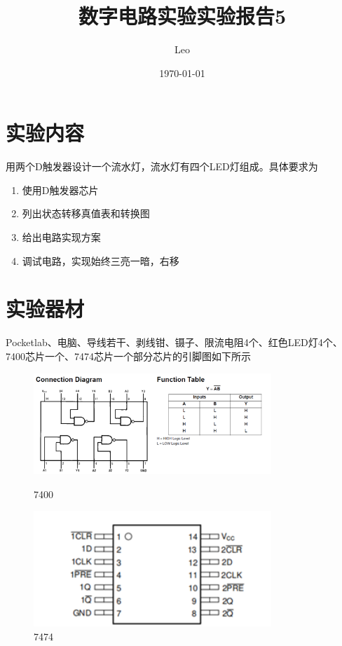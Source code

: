 \documentclass{ctexart}
\title{数字电路实验\quad 实验报告5}
\author{Leo}
\date{\today}
\begin{document}
\maketitle
\section{实验内容}
用两个D触发器设计一个流水灯，流水灯有四个LED灯组成。具体要求为
\begin{enumerate}
    \item 使用D触发器芯片
    \item 列出状态转移真值表和转换图
    \item 给出电路实现方案
    \item 调试电路，实现始终三亮一暗，右移
\end{enumerate}
\section{实验器材}
Pocketlab、电脑、导线若干、剥线钳、镊子、限流电阻4个、红色LED灯4个、7400芯片一个、7474芯片一个部分芯片的引脚图如下所示
\begin{figure}[H]
    \centering
    \begin{minipage}{0.5\textwidth}
    \centering
           \includegraphics[width=0.8\textwidth]{7400.png}
           \caption{7400}
    \label{}
    \end{minipage}
    \hspace{0.05\textwidth}
    \begin{minipage}{0.3\textwidth}
    \centering
           \includegraphics[width=0.8\textwidth]{7474.png}
           \caption{7474}
    \label{7474}
    \end{minipage}
\end{figure}
\end{document}
